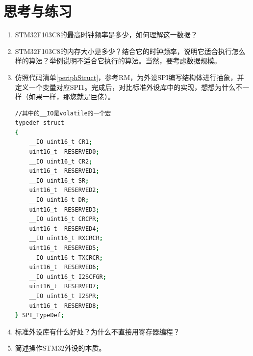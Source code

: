 \section{思考与练习}
\begin{enumerate}
	\item STM32F103C8的最高时钟频率是多少，如何理解这一数据？
	\item STM32F103C8的内存大小是多少？结合它的时钟频率，说明它适合执行怎么样的算法？举例说明不适合它执行的算法。当然，要考虑数据规模。
	\item 仿照代码清单\ref{periphStruct}，参考\acs{RM}，为外设SPI编写结构体进行抽象，并定义一个变量对应SPI1。完成后，对比标准外设库中的实现，想想为什么不一样（如果一样，那您就是巨佬）。
		\begin{lstlisting}[language=bash, style=customStyleC, caption=标准外设库中的SPI结构体]
//其中的__IO是volatile的一个宏
typedef struct
{
	__IO uint16_t CR1;
	uint16_t  RESERVED0;
	__IO uint16_t CR2;
	uint16_t  RESERVED1;
	__IO uint16_t SR;
	uint16_t  RESERVED2;
	__IO uint16_t DR;
	uint16_t  RESERVED3;
	__IO uint16_t CRCPR;
	uint16_t  RESERVED4;
	__IO uint16_t RXCRCR;
	uint16_t  RESERVED5;
	__IO uint16_t TXCRCR;
	uint16_t  RESERVED6;
	__IO uint16_t I2SCFGR;
	uint16_t  RESERVED7;
	__IO uint16_t I2SPR;
	uint16_t  RESERVED8;  
} SPI_TypeDef;
		\end{lstlisting}
	\item 标准外设库有什么好处？为什么不直接用寄存器编程？
	\item 简述操作STM32外设的本质。
\end{enumerate}











